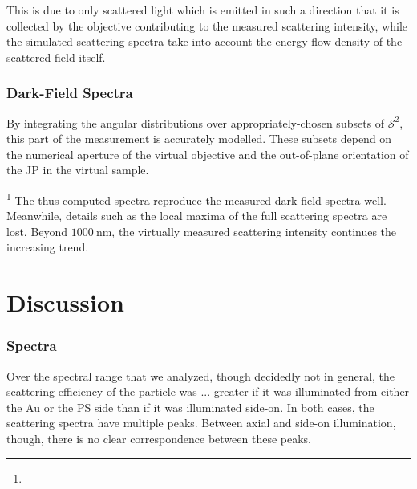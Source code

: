 \documentclass[10pt]{article}
\begin{document}
This is due to only scattered light which is emitted in such a direction that it is collected by the objective contributing to the measured scattering intensity, while the simulated scattering spectra take into account the energy flow density of the scattered field itself. 


\subsubsection*{Dark-Field Spectra}

By integrating the angular distributions over appropriately-chosen subsets of $\mathcal{S}^2$, this part of the measurement is accurately modelled. 
These subsets depend on the numerical aperture of the virtual objective and the out-of-plane orientation of the JP in the virtual sample. 

\footnote{} 
The thus computed spectra reproduce the measured dark-field spectra well. 
Meanwhile, details such as the local maxima of the full scattering spectra are lost. 
Beyond $\SI{1000}{\nano\meter}$, the virtually measured scattering intensity continues the increasing trend.  







\section*{Discussion}

\subsubsection*{Spectra}

Over the spectral range that we analyzed, though decidedly not in general, the scattering efficiency of the particle was ... greater if it was illuminated from either the Au or the PS side than if it was illuminated side-on. 
In both cases, the scattering spectra have multiple peaks. 
Between axial and side-on illumination, though, there is no clear correspondence between these peaks. 
\end{document}
